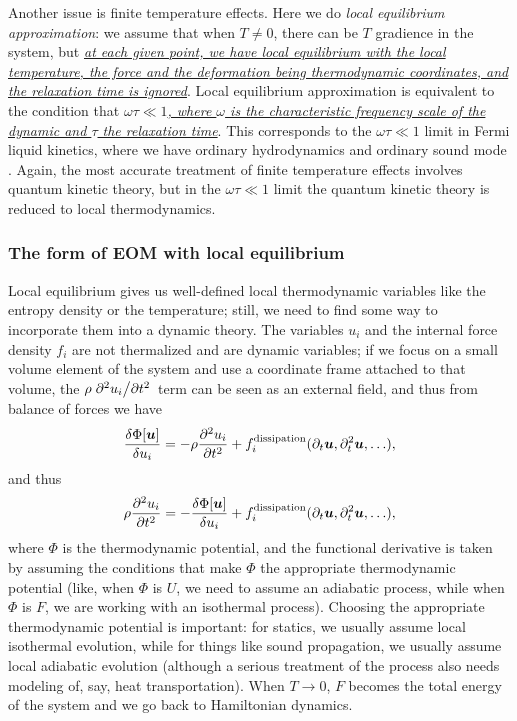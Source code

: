 \documentclass[hyperref, a4paper]{article}
\begin{document}
Another issue is finite temperature effects. 
Here we do \emph{local equilibrium approximation}:
we assume that when $T \neq 0$,
there can be $T$ gradience in the system,
but \ul{\emph{at each given point, 
we have local equilibrium with the local temperature, the force and the deformation
being thermodynamic coordinates,
and the relaxation time is ignored}}.
Local equilibrium approximation is equivalent to the 
condition that \ul{\emph{$\omega \tau \ll 1$,
where $\omega$ is the characteristic frequency scale of the dynamic
and $\tau$ the relaxation time}}.
This corresponds to the $\omega \tau \ll 1$ limit in Fermi liquid kinetics,
where we have ordinary hydrodynamics and ordinary sound mode \cite{belitz2022soft}.
Again, the most accurate treatment of finite temperature effects involves 
quantum kinetic theory,
but in the $\omega \tau \ll 1$ limit 
the quantum kinetic theory is reduced to local thermodynamics.

\subsubsection{The form of EOM with local equilibrium}

Local equilibrium gives us well-defined 
local thermodynamic variables like the entropy density or the temperature;
still, we need to find some way to incorporate them 
into a dynamic theory.
The variables $u_i$ and the internal force density $f_i$ are not thermalized
and are dynamic variables;
if we focus on a small volume element of the system 
and use a coordinate frame attached to that volume,
the $\rho \pdv*[2]{u_i}{t}$ term can be seen as an external field, 
and thus from balance of forces we have 
\[
    \fdv{\Phi[\vb*{u}]}{u_i} =
    - \rho \pdv[2]{u_i}{t} + f^{\text{dissipation}}_i(\partial_t \vb*{u}, \partial_t^2 \vb*{u}, \ldots),
\]
and thus 
\begin{equation}
    \rho \pdv[2]{u_i}{t} = - \fdv{\Phi[\vb*{u}]}{u_i} + f^{\text{dissipation}}_i(\partial_t \vb*{u}, \partial_t^2 \vb*{u}, \ldots),
    \label{eq:eom-general-1}
\end{equation}
where $\Phi$ is the thermodynamic potential,
and the functional derivative is taken by 
assuming the conditions that make $\Phi$ the appropriate thermodynamic potential
(like, when $\Phi$ is $U$, 
we need to assume an adiabatic process, 
while when $\Phi$ is $F$,
we are working with an isothermal process).
Choosing the appropriate thermodynamic potential is important:
for statics, we usually assume local isothermal evolution,
while for things like sound propagation,
we usually assume local adiabatic evolution
(although a serious treatment of the process 
also needs modeling of, say, heat transportation).
When $T \to 0$, $F$ becomes the total energy of the system 
and we go back to Hamiltonian dynamics.
\end{document}
